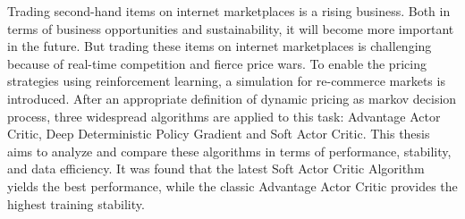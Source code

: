 Trading second-hand items on internet marketplaces is a rising business.
Both in terms of business opportunities and sustainability, it will become more important in the future.
But trading these items on internet marketplaces is challenging because of real-time competition and fierce price wars.
To enable the pricing strategies using reinforcement learning, a simulation for re-commerce markets is introduced.
After an appropriate definition of dynamic pricing as markov decision process, three widespread algorithms are applied to this task:
Advantage Actor Critic, Deep Deterministic Policy Gradient and Soft Actor Critic.
This thesis aims to analyze and compare these algorithms in terms of performance, stability, and data efficiency.
It was found that the latest Soft Actor Critic Algorithm yields the best performance, while the classic Advantage Actor Critic provides the highest training stability.
